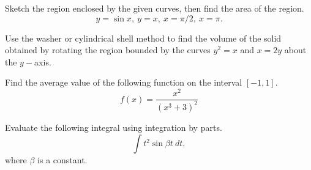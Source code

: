 \documentclass[12pt]{exam}
\begin{document}
\begin{questions}
\question[20] Sketch the region enclosed by the given curves, then find the area of the region. \[
y= \sin x,~ y=x, ~x =\pi/2,~x=\pi.
\]
\vfill
\droptotalpoints
\newpage

\question[20] Use the washer or cylindrical shell method to find the volume of the solid obtained by rotating the region bounded by the curves $y^2=x$ and $x=2y$ about the $y-$axis. 

\vfill
\droptotalpoints
\newpage

\question[10] Find the average value of the following function on the interval \([-1,1]\). 
\[
f(x)=\dfrac{x^2}{(x^3+3)^2}
\] 
\vfill
\droptotalpoints
\newpage

\question[15] Evaluate the following integral using integration by parts.
\[
\int t^2 \sin {\beta t}~dt,
\] where \(\beta \) is a constant. 
\vfill
\droptotalpoints






\end{questions}
\end{document}
